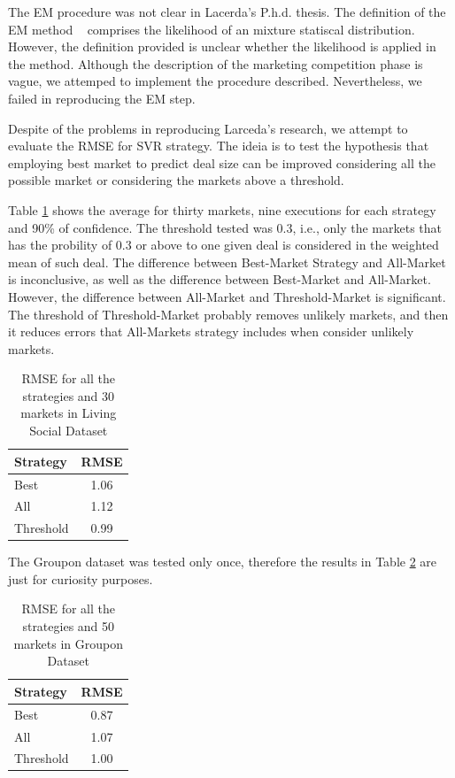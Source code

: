 \documentclass{acm_proc_article-sp}
\begin{document}
The EM procedure was not clear in Lacerda's P.h.d. thesis. The definition of 
the EM method ~\cite{hastie2009elements} comprises the likelihood 
of an mixture statiscal distribution. However, the definition 
provided is unclear whether the likelihood is applied in the 
method. Although the description of  the 
marketing competition phase is vague, we attemped to implement 
the procedure described. Nevertheless, we failed in reproducing 
the EM step.

Despite of the problems in reproducing Larceda's research, we 
attempt to evaluate the  RMSE for SVR strategy. The ideia is 
to test the hypothesis that employing best market to 
predict deal size can be improved considering all the possible 
market or considering the markets above a threshold.

Table \ref{rmsetable} shows the average for thirty markets,  
nine executions for each strategy and 90\% of confidence.
The threshold tested was $0.3$, i.e., 
only the markets that has the probility of $0.3$ or above to 
 one given deal is considered in the weighted mean of such deal. 
The difference between Best-Market 
Strategy and All-Market is 
inconclusive, as well as the difference between Best-Market and 
All-Market. However, the difference between All-Market and 
Threshold-Market is significant. The threshold of Threshold-Market 
probably removes unlikely markets, and then it reduces errors
that All-Markets strategy includes when consider unlikely 
markets. 


\begin{table}[H]
    \centering
    \caption{RMSE for all the strategies and 30 markets in Living Social Dataset}
    \label{rmsetable}
    \begin{tabular}{lc} \hline
	Strategy & RMSE \\ \hline \hline
	Best & 1.06\\
        All & 1.12 \\
	Threshold & 0.99 \\ \hline
    \end{tabular}
\end{table}

The Groupon dataset was tested only once, therefore the results in Table 
\ref{rmsetablegroupon} are just for curiosity purposes.

\begin{table}[H]
    \centering
    \caption{RMSE for all the strategies and 50 markets in Groupon Dataset}
    \label{rmsetablegroupon}
    \begin{tabular}{lc} \hline
	Strategy & RMSE \\ \hline \hline
	Best & 0.87\\
        All & 1.07 \\
	Threshold & 1.00 \\ \hline
    \end{tabular}
\end{table}
\end{document}
